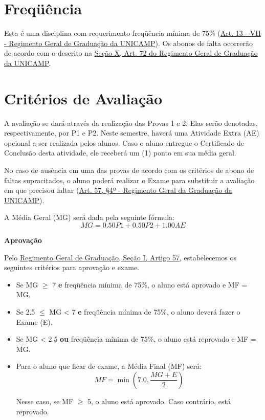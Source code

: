 \documentclass[paper=letter, fontsize=12pt]{scrartcl} %
\begin{document}
\section{Freqüência}

Esta é uma disciplina com requerimento freqüência mínima de 75\% (\href{https://www.dac.unicamp.br/portal/graduacao/regimento-geral}{Art. 13 - VII - Regimento Geral de Graduação da UNICAMP}). Os abonos de falta ocorrerão de acordo com o descrito na \href{https://www.dac.unicamp.br/portal/graduacao/regimento-geral}{Seção X, Art. 72 do Regimento Geral de Graduação da UNICAMP}.

\section{Critérios de Avaliação}

A avaliação se dará através da realização das Provas 1 e 2. Elas serão denotadas, respectivamente, por P1 e P2. Neste semestre, haverá uma Atividade Extra (AE) opcional a ser realizada pelos alunos. Caso o aluno entregue o Certificado de Conclusão desta atividade, ele receberá um (1) ponto em sua média geral.

No caso de ausência em uma das provas de acordo com os critérios de abono de faltas supracitados, o aluno poderá realizar o Exame para substituir a avaliação em que precisou faltar (\href{https://www.dac.unicamp.br/portal/graduacao/regimento-geral}{Art. 57, §4º - Regimento Geral da Graduação da UNICAMP}).

\vspace{10pt}

A Média Geral (MG) será dada pela seguinte fórmula:
\[MG = 0.50 P1 + 0.50 P2 + 1.00 AE\]

\textbf{Aprovação}

Pelo \href{https://www.dac.unicamp.br/portal/graduacao/regimento-geral}{{\color{blue} Regimento Geral de Graduação, Seção I, Artigo 57}}, estabelecemos os seguintes critérios para aprovação e exame.

\begin{itemize}
\item Se MG $\geq$ 7 \textbf{e} freqüência mínima de 75\%, o aluno está aprovado e MF = MG.

\item Se 2.5 $\leq$ MG < 7 \textbf{e} freqüência mínima de 75\%, o aluno deverá fazer o Exame (E).

\item Se MG < 2.5 \textbf{ou} freqüência mínima de 75\%, o aluno está reprovado e MF = MG.

\item Para o aluno que ficar de exame, a Média Final (MF) será:
$$MF = \min\left(7.0, \frac{MG + E}{2}\right)$$

Nesse caso, se MF $\geq$ 5, o aluno está aprovado. Caso contrário, está reprovado.


\end{itemize}
\end{document}
